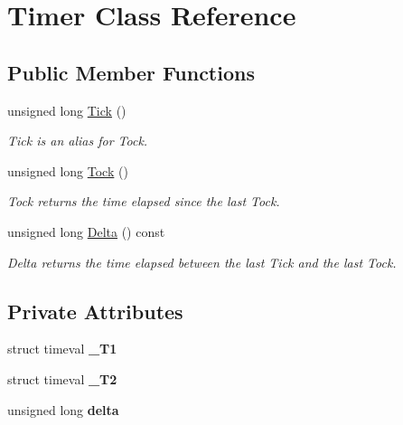 \hypertarget{class_timer}{\section{Timer Class Reference}
\label{class_timer}
}
\subsection*{Public Member Functions}
\begin{DoxyCompactItemize}
\item 
unsigned long \hyperlink{class_timer_a4e69d3c5a312d1b29d1735b2c5bccefb}{Tick} ()
\begin{DoxyCompactList}\small\item\em Tick is an alias for Tock. \end{DoxyCompactList}\item 
unsigned long \hyperlink{class_timer_a2c58a2e04e1e30926805aa4e82d2a0a5}{Tock} ()
\begin{DoxyCompactList}\small\item\em Tock returns the time elapsed since the last Tock. \end{DoxyCompactList}\item 
unsigned long \hyperlink{class_timer_a4f68da5b62cb1d1b2dd0c8549eb6286d}{Delta} () const 
\begin{DoxyCompactList}\small\item\em Delta returns the time elapsed between the last Tick and the last Tock. \end{DoxyCompactList}\end{DoxyCompactItemize}
\subsection*{Private Attributes}
\begin{DoxyCompactItemize}
\item 
\hypertarget{class_timer_a384a34d671fa58160f0ea13713645462}{struct timeval {\bfseries \-\_\-\-T1}}\label{class_timer_a384a34d671fa58160f0ea13713645462}

\item 
\hypertarget{class_timer_a22691ac7f27eed709461091c1125d931}{struct timeval {\bfseries \-\_\-\-T2}}\label{class_timer_a22691ac7f27eed709461091c1125d931}

\item 
\hypertarget{class_timer_a3ded2a527b99c1fd983ea9583a7ebcdb}{unsigned long {\bfseries delta}}\label{class_timer_a3ded2a527b99c1fd983ea9583a7ebcdb}

\end{DoxyCompactItemize}


